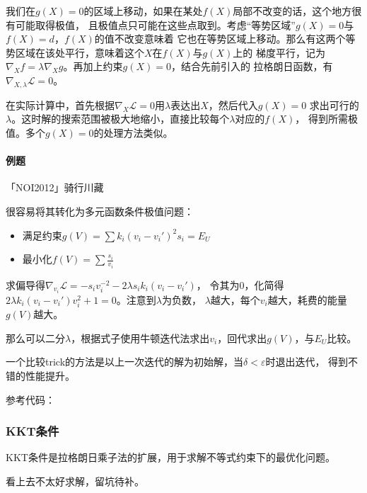 我们在$g(X)=0$的区域上移动，如果在某处$f(X)$局部不改变的话，这个地方很有可能取得极值，
且极值点只可能在这些点取到。考虑``等势区域''$g(X)=0$与$f(X)=d$，$f(X)$的值不改变意味着
它也在等势区域上移动。那么有这两个等势区域在该处平行，意味着这个$X$在$f(X)$与$g(X)$上的
梯度平行，记为$\nabla_X f=\lambda \nabla_X g$。再加上约束$g(X)=0$，结合先前引入的
拉格朗日函数，有$\nabla_{X,\lambda} \mathcal{L}=0$。

在实际计算中，首先根据$\nabla_X \mathcal{L}=0$用$\lambda$表达出$X$，然后代入$g(X)=0$
求出可行的$\lambda$。这时解的搜索范围被极大地缩小，直接比较每个$\lambda$对应的$f(X)$，
得到所需极值。多个$g(X)=0$的处理方法类似。

\paragraph{例题} 「NOI2012」骑行川藏

很容易将其转化为多元函数条件极值问题：
\begin{itemize}
	\item 满足约束$\displaystyle g(V)=\sum{k_i(v_i-v_i')^2s_i}=E_U$
	\item 最小化$\displaystyle f(V)=\sum{\frac{s_i}{v_i}}$
\end{itemize}

求偏导得$\nabla_{v_i} \mathcal{L}=-s_iv_i^{-2}-2\lambda s_ik_i(v_i-v_i')$，
令其为0，化简得$2\lambda k_i(v_i-v_i')v_i^2+1=0$。注意到$\lambda$为负数，
$\lambda$越大，每个$v_i$越大，耗费的能量$g(V)$越大。

那么可以二分$\lambda$，根据式子使用牛顿迭代法求出$v_i$，回代求出$g(V)$，与$E_U$比较。

一个比较trick的方法是以上一次迭代的解为初始解，当$\delta<\varepsilon$时退出迭代，
得到不错的性能提升。

参考代码：


\subsubsection{KKT条件}
KKT条件是拉格朗日乘子法的扩展，用于求解不等式约束下的最优化问题。

看上去不太好求解，留坑待补。
